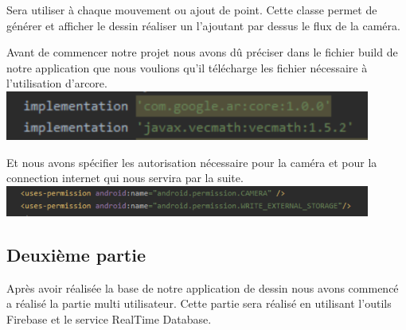 \documentclass[12pt]{article}
\begin{document}
	\par
	Sera utiliser à chaque mouvement ou ajout de point. Cette classe permet de générer et afficher le dessin réaliser un l’ajoutant par dessus le flux de la caméra.
	\par
	Avant de commencer notre projet nous avons dû préciser dans le fichier build de notre application que nous voulions qu’il télécharge les fichier nécessaire à l’utilisation d’arcore. 
	\newline
	\includegraphics[width=0.9\textwidth]{Capture7.png}
	\newline
	\par
	Et nous avons spécifier les autorisation nécessaire pour la caméra et pour la connection internet qui nous servira par la suite.
	\newline
	\includegraphics[width=0.9\textwidth]{Capture6.png}
	\newline
	\subsection{Deuxième partie}
	\par
	Après avoir réalisée la base de notre application de dessin nous avons commencé a réalisé la partie multi utilisateur. Cette partie sera réalisé en utilisant l’outils Firebase et le service RealTime Database.
\end{document}
